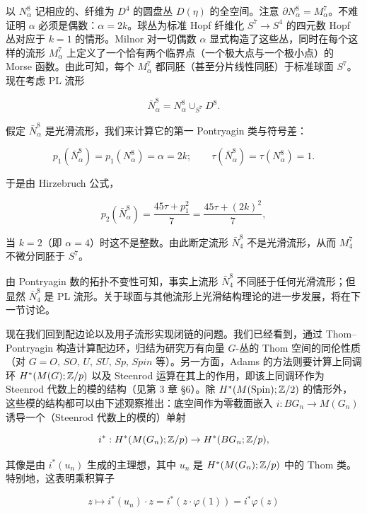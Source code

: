 以 $N_\alpha^8$ 记相应的、纤维为 $D^4$ 的圆盘丛 $D(\eta)$ 的全空间。注意 $\partial N_\alpha^8=M_\alpha^7$。不难证明 $\alpha$ 必须是偶数：$\alpha=2k$。球丛为标准 Hopf 纤维化 $S^7\to S^4$ 的四元数 Hopf 丛对应于 $k=1$ 的情形。Milnor 对一切偶数 $\alpha$ 显式构造了这些丛，同时在每个这样的流形 $M_\alpha^7$ 上定义了一个恰有两个临界点（一个极大点与一个极小点）的 Morse 函数。由此可知，每个 $M_\alpha^7$ 都同胚（甚至分片线性同胚）于标准球面 $S^7$。现在考虑 PL 流形

\[ \bar N_\alpha^8=N_\alpha^8\cup_{S^7}D^8. \]

假定 $\bar N_\alpha^8$ 是光滑流形，我们来计算它的第一 Pontryagin 类与符号差：

\begin{equation}
p_1(\bar N_\alpha^8)=p_1(N_\alpha^8)=\alpha=2k;\qquad \tau(\bar N_\alpha^8)=\tau(N_\alpha^8)=1. \tag{3.30}
\end{equation}

于是由 Hirzebruch 公式，

\[ p_2(\bar N_\alpha^8)=\frac{45\tau+p_1^2}{7}=\frac{45\tau+(2k)^2}{7}, \]

当 $k=2$（即 $\alpha=4$）时这不是整数。由此断定流形 $\bar N_4^8$ 不是光滑流形，从而 $M_4^7$ 不微分同胚于 $S^7$。

由 Pontryagin 数的拓扑不变性可知，事实上流形 $\bar N_4^8$ 不同胚于任何光滑流形；但显然 $\bar N_4^8$ 是 PL 流形。关于球面与其他流形上光滑结构理论的进一步发展，将在下一节讨论。


现在我们回到配边论以及用子流形实现闭链的问题。我们已经看到，通过 Thom--Pontryagin 构造计算配边环，归结为研究万有向量 $G$-丛的 Thom 空间的同伦性质（对 $G=O,\,SO,\,U,\,SU,\,Sp,\,Spin$ 等）。另一方面，Adams 的方法则要计算上同调环 $H^*(M(G);\mathbb{Z}/p)$ 以及 Steenrod 运算在其上的作用，即该上同调环作为 Steenrod 代数上的模的结构（见第 3 章 §6）。除 $H^*(M(\mathrm{Spin});\mathbb{Z}/2)$ 的情形外，这些模的结构都可以由下述观察推出：底空间作为零截面嵌入 $i:BG_n\to M(G_n)$ 诱导一个（Steenrod 代数上的模的）单射

\[ i^*:H^*(M(G_n);\mathbb{Z}/p)\to H^*(BG_n;\mathbb{Z}/p), \]

其像是由 $i^*(u_n)$ 生成的主理想，其中 $u_n$ 是 $H^*(M(G_n);\mathbb{Z}/p)$ 中的 Thom 类。特别地，这表明乘积算子

\begin{equation}
z\mapsto i^*(u_n)\cdot z=i^*(z\cdot\varphi(1))=i^*\varphi(z) \tag{3.31}
\end{equation}

